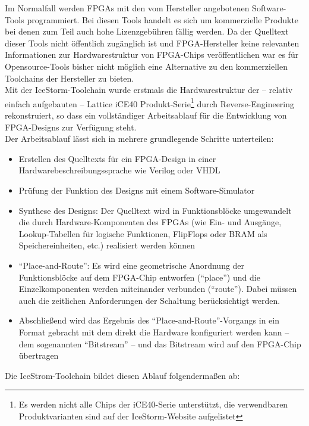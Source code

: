 Im Normalfall werden FPGAs mit den vom Hersteller angebotenen Software-Tools programmiert. Bei diesen Tools handelt es sich um kommerzielle Produkte bei denen zum Teil auch hohe Lizenzgebühren fällig werden. Da der Quelltext dieser Tools nicht öffentlich zugänglich ist und FPGA-Hersteller keine relevanten Informationen zur Hardwarestruktur von FPGA-Chips veröffentlichen war es für Opensource-Tools bisher nicht möglich eine Alternative zu den kommerziellen Toolchains der Hersteller zu bieten.\\
Mit der IceStorm-Toolchain wurde erstmals die Hardwarestruktur der -- relativ einfach aufgebauten -- Lattice iCE40 Produkt-Serie\footnote{Es werden nicht alle Chips der iCE40-Serie unterstützt, die verwendbaren Produktvarianten sind auf der IceStorm-Website aufgelistet\cite{web:IceStorm}} durch \gls{Reverse-Engineering} rekonstruiert, so dass ein vollständiger Arbeitsablauf für die Entwicklung von FPGA-Designs zur Verfügung steht.\\
Der Arbeitsablauf lässt sich in mehrere grundlegende Schritte unterteilen:
\begin{itemize}
	\item Erstellen des Quelltexts für ein FPGA-Design in einer Hardwarebeschreibungssprache wie \gls{Verilog} oder \acrshort{VHDL}
	\item Prüfung der Funktion des Designs mit einem Software-Simulator
	\item Synthese des Designs: Der Quelltext wird in Funktionsblöcke umgewandelt die durch Hardware-Komponenten des FPGAs (wie Ein- und Ausgänge, Lookup-Tabellen für logische Funktionen, FlipFlops oder BRAM als Speichereinheiten, etc.) realisiert werden können
	\item ``Place-and-Route'': Es wird eine geometrische Anordnung der Funktionsblöcke auf dem FPGA-Chip entworfen (``place'') und die Einzelkomponenten werden miteinander verbunden (``route''). Dabei müssen auch die zeitlichen Anforderungen der Schaltung berücksichtigt werden.
	\item Abschließend wird das Ergebnis des ``Place-and-Route''-Vorgangs in ein Format gebracht mit dem direkt die Hardware konfiguriert werden kann -- dem sogenannten ``Bitstream'' -- und das Bitstream wird auf den FPGA-Chip übertragen
\end{itemize}

Die IceStrom-Toolchain bildet diesen Ablauf folgendermaßen ab:

